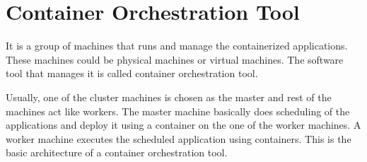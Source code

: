 \section{Container Orchestration Tool}
\label{sec:ContainerOrchestrationTool}
It is a group of machines that runs and manage the containerized applications. These machines could be physical machines or virtual machines. The software tool that manages it is called container orchestration tool. 

Usually, one of the cluster machines is chosen as the master and rest of the machines act like workers. The master machine basically does scheduling of the applications and deploy it using a container on the one of the worker machines. A worker machine executes the scheduled application using containers. This is the basic architecture of a container orchestration tool.

